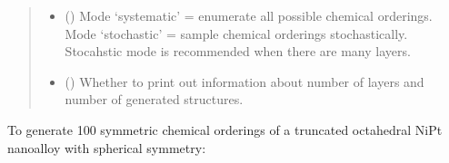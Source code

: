\documentclass[letterpaper,10pt,english]{sphinxmanual}
\begin{document}
\begin{fulllineitems}
\begin{fulllineitems}
\begin{quote}
\begin{description}
\begin{itemize}
\item {} 
 (\sphinxstyleliteralemphasis{\sphinxupquote{, }}) \textendash{} Mode ‘systematic’ = enumerate all possible chemical orderings.
Mode ‘stochastic’ = sample chemical orderings stochastically.
Stocahstic mode is recommended when there are many layers.

\item {} 
 (\sphinxstyleliteralemphasis{\sphinxupquote{, }}) \textendash{} Whether to print out information about number of layers and
number of generated structures.

\end{itemize}

\end{description}\end{quote}

\end{fulllineitems}


\end{fulllineitems}



To generate 100 symmetric chemical orderings of a truncated
octahedral NiPt nanoalloy with spherical symmetry:
\end{document}
